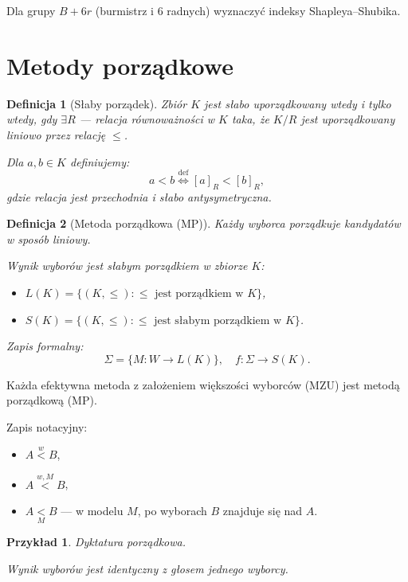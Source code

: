 \documentclass[12pt,a4paper]{article}
\theoremstyle{break}
\newtheorem{definition}{Definicja}[section]
\newtheorem{example}{Przykład}[section]
\begin{document}
	\begin{zad}
		Dla grupy $B + 6r$ (burmistrz i 6 radnych) wyznaczyć indeksy Shapleya–Shubika.
	\end{zad}
	
	\newpage
	
	\section{Metody porządkowe}
	
	\begin{definition}[Słaby porządek]
		Zbiór $K$ jest słabo uporządkowany wtedy i tylko wtedy, gdy $\exists R$ — relacja równoważności w $K$ taka, że $K / R$ jest uporządkowany liniowo przez relację $\leq$. 
		
		Dla $a, b \in K$ definiujemy: 
		\[
		a < b \overset{\text{def}}{\Leftrightarrow} [a]_R < [b]_R,
		\]
		gdzie relacja jest przechodnia i słabo antysymetryczna.
	\end{definition}
	
	\begin{definition}[Metoda porządkowa (MP)]
		Każdy wyborca porządkuje kandydatów w sposób liniowy.
		
		Wynik wyborów jest słabym porządkiem w zbiorze $K$:
		\begin{itemize}
			\item $L(K) = \{(K, \leq) : \leq \text{ jest porządkiem w } K\}$,
			\item $S(K) = \{(K, \leq) : \leq \text{ jest słabym porządkiem w } K\}$.
		\end{itemize}
		
		Zapis formalny:
		\[
		\Sigma = \{ M : W \rightarrow L(K) \}, \quad f : \Sigma \rightarrow S(K).
		\]
	\end{definition}
	
	Każda efektywna metoda z założeniem większości wyborców (MZU) jest metodą porządkową (MP).
	
	Zapis notacyjny:
	\begin{itemize}
		\item $A \overset{w}{<} B$, 
		\item $A \overset{w, M}{<} B$, 
		\item $A \underset{M}{<} B$ — w modelu $M$, po wyborach $B$ znajduje się nad $A$.
	\end{itemize}
	
	\begin{example}
		Dyktatura porządkowa.  
		
		Wynik wyborów jest identyczny z głosem jednego wyborcy.
	\end{example}
	
\end{document}
